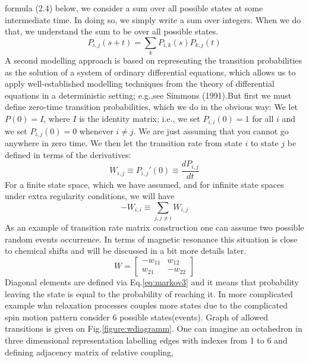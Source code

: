 formula (2.4) below, we consider a sum over all possible states at some intermediate time. In doing so, we simply write a sum over integers. When we do that, we understand the sum to be over all possible states.
\begin{equation}\label{eq:markov}
P_{i,j}(s+t)= \sum_k P_{i,k}(s)P_{k,j}(t)
\end{equation} 
A second modelling approach is based on representing the transition probabilities as the solution of a system of ordinary differential equations, which allows us to apply well-established modelling techniques from the theory of differential equations in a deterministic setting; e.g.,see Simmons (1991).But first we must define zero-time transition probabilities, which we do in the obvious way: We let $P(0) = I$, where $I$ is the identity matrix; i.e., we set $P_{i,i}(0) = 1$ for all $i$ and we set $P_{i,j} (0) = 0$ whenever $i \neq j$. We are just assuming that you cannot go anywhere in zero
time. We then let the transition rate from state $i$ to state $j$ be defined in terms of the derivatives:
\begin{equation}\label{eq:markov3}
W_{i,j}\equiv P_{i,j}'(0)\equiv \frac{dP_{i,j}}{dt}
\end{equation} 
For a finite state space, which we have assumed, and for infinite state spaces under extra regularity conditions, we will have
\begin{equation}\label{eq:markov3}
-W_{i,i}\equiv\sum_{j,j\neq i}W_{i,j}
\end{equation} 
As an example of transition rate matrix construction one can assume two possible random events occurrence. In terms of magnetic resonance this situation is close to chemical shifts and will be discussed in a bit more details later.  
\begin{equation}\label{eq:55}
W = \begin{bmatrix}
       -w_{11} & w_{12}  \\[0.3em]
        w_{21} & -w_{22}  
     \end{bmatrix}
\end{equation}
Diagonal elements are defined via Eq.\ref{eq:markov3} and it means that probability leaving the state is equal to the probability of reaching it. In more complicated example whn relaxation processes couples more states due to the complicated spin motion pattern consider 6 possible states(events). Graph of allowed transitions is given on Fig.\ref{figure:wdiagramm}. One can imagine an octahedron in three dimensional representation labelling edges with indexes from 1 to 6 and defining adjacency matrix of relative coupling,    
